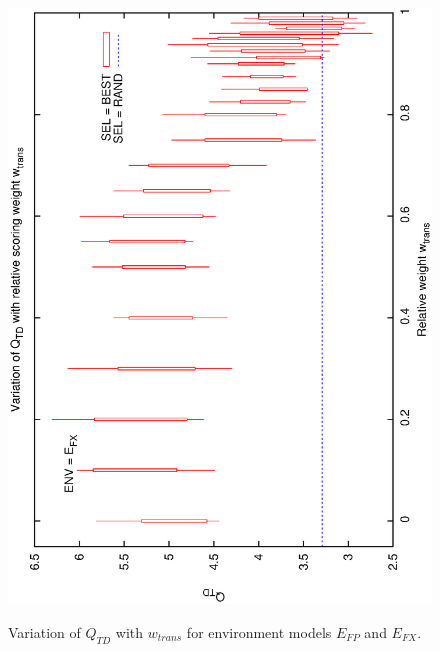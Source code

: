 \begin{figure}[h]
\begin{center}
{      \includegraphics[scale=0.5, angle=-90]{figures/cs1_dw2_td.eps} 
      \label{fig:cs1_dw2_td}
  }
 \caption[Variation of $Q_{TD}$ with $w_{trans}$ for environment models $E_{FP}$ and $E_{FX}$]
{Variation of $Q_{TD}$ with $w_{trans}$ for environment models $E_{FP}$ and $E_{FX}$.}
 \end{center}
\end{figure}

